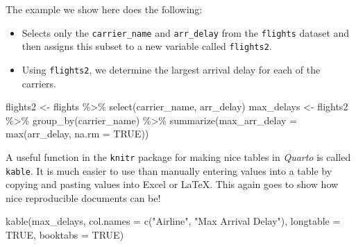 \documentclass[
  letterpaper,
  12pt,
  twoside]{reedthesis}
\newenvironment{Shaded}{\begin{snugshade}}{\end{snugshade}}
\newcommand{\AttributeTok}[1]{\textcolor[rgb]{0.40,0.45,0.13}{#1}}
\newcommand{\ConstantTok}[1]{\textcolor[rgb]{0.56,0.35,0.01}{#1}}
\newcommand{\FunctionTok}[1]{\textcolor[rgb]{0.28,0.35,0.67}{#1}}
\newcommand{\NormalTok}[1]{\textcolor[rgb]{0.00,0.23,0.31}{#1}}
\newcommand{\OtherTok}[1]{\textcolor[rgb]{0.00,0.23,0.31}{#1}}
\newcommand{\SpecialCharTok}[1]{\textcolor[rgb]{0.37,0.37,0.37}{#1}}
\newcommand{\StringTok}[1]{\textcolor[rgb]{0.13,0.47,0.30}{#1}}
\begin{document}
The example we show here does the following:

\begin{itemize}
\item
  Selects only the \texttt{carrier\_name} and \texttt{arr\_delay} from
  the \texttt{flights} dataset and then assigns this subset to a new
  variable called \texttt{flights2}.
\item
  Using \texttt{flights2}, we determine the largest arrival delay for
  each of the carriers.
\end{itemize}

\begin{Shaded}
\begin{Highlighting}[]
\NormalTok{flights2 }\OtherTok{\textless{}{-}}\NormalTok{ flights }\SpecialCharTok{\%\textgreater{}\%}
  \FunctionTok{select}\NormalTok{(carrier\_name, arr\_delay)}
\NormalTok{max\_delays }\OtherTok{\textless{}{-}}\NormalTok{ flights2 }\SpecialCharTok{\%\textgreater{}\%}
  \FunctionTok{group\_by}\NormalTok{(carrier\_name) }\SpecialCharTok{\%\textgreater{}\%}
  \FunctionTok{summarize}\NormalTok{(}\AttributeTok{max\_arr\_delay =} \FunctionTok{max}\NormalTok{(arr\_delay, }\AttributeTok{na.rm =} \ConstantTok{TRUE}\NormalTok{))}
\end{Highlighting}
\end{Shaded}

A useful function in the \texttt{knitr} package for making nice tables
in \emph{Quarto} is called \texttt{kable}. It is much easier to use than
manually entering values into a table by copying and pasting values into
Excel or LaTeX. This again goes to show how nice reproducible documents
can be!

\begin{Shaded}
\begin{Highlighting}[]
\FunctionTok{kable}\NormalTok{(max\_delays,}
      \AttributeTok{col.names =} \FunctionTok{c}\NormalTok{(}\StringTok{"Airline"}\NormalTok{, }\StringTok{"Max Arrival Delay"}\NormalTok{),}
      \AttributeTok{longtable =} \ConstantTok{TRUE}\NormalTok{,}
      \AttributeTok{booktabs =} \ConstantTok{TRUE}\NormalTok{)}
\end{Highlighting}
\end{Shaded}
\end{document}
